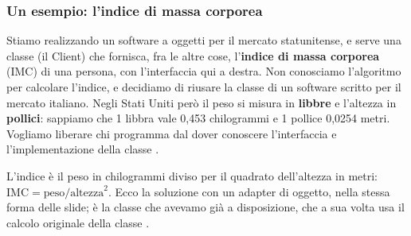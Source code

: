 \subsubsection*{Un esempio: l'indice di massa corporea}

\noindent\begin{minipage}[c]{0.66\textwidth}
Stiamo realizzando un software a oggetti per il mercato statunitense, e serve una classe  (il Client) che
fornisca, fra le altre cose, l'\textbf{indice di massa corporea} (IMC) di una persona, con l'interfaccia qui a destra. Non
conosciamo l'algoritmo per calcolare l'indice, e decidiamo di riusare la classe  di un software scritto per il
mercato italiano. Negli Stati Uniti però il peso si misura in \textbf{libbre} e l'altezza in \textbf{pollici}: sappiamo che
1 libbra vale 0,453 chilogrammi e 1 pollice 0,0254 metri. Vogliamo liberare chi programma  dal dover conoscere
l'interfaccia e l'implementazione della classe .
\end{minipage}\hfill
\begin{minipage}[c]{0.31\textwidth}
\centering
{}
\end{minipage}

\medskip
L'indice è il peso in chilogrammi diviso per il quadrato dell'altezza in metri: $\mathrm{IMC} = \text{peso} /
\text{altezza}^2$. Ecco la soluzione con un adapter di oggetto, nella stessa forma delle slide;  è la classe
che avevamo già a disposizione, che a sua volta usa il calcolo originale della classe .

